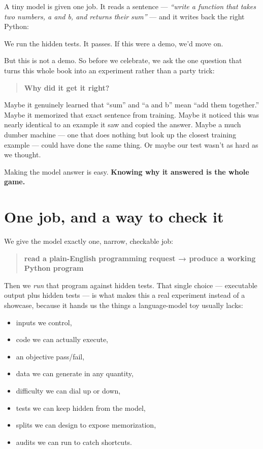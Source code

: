 A tiny model is given one job. It reads a sentence --- \emph{``write a
function that takes two numbers, a and b, and returns their sum''} ---
and it writes back the right Python:

\begin{Shaded}
\begin{Highlighting}[]
    \OperatorTok{+}
\end{Highlighting}
\end{Shaded}

We run the hidden tests. It passes. If this were a demo, we'd move on.

But this is not a demo. So before we celebrate, we ask the one question
that turns this whole book into an experiment rather than a party trick:

\begin{quote}
\textbf{Why did it get it right?}
\end{quote}

Maybe it genuinely learned that ``sum'' and ``a and b'' mean ``add them
together.'' Maybe it memorized that exact sentence from training. Maybe
it noticed this was nearly identical to an example it saw and copied the
answer. Maybe a much dumber machine --- one that does nothing but look
up the closest training example --- could have done the same thing. Or
maybe our test wasn't as hard as we thought.

Making the model answer is easy. \textbf{Knowing why it answered is the
whole game.}

\section{One job, and a way to check
it}\label{one-job-and-a-way-to-check-it}

We give the model exactly one, narrow, checkable job:

\begin{quote}
\textbf{read a plain-English programming request → produce a working
Python program}
\end{quote}

Then we \emph{run} that program against hidden tests. That single choice
--- executable output plus hidden tests --- is what makes this a real
experiment instead of a showcase, because it hands us the things a
language-model toy usually lacks:

\begin{itemize}
\tightlist
\item
  inputs we control,
\item
  code we can actually execute,
\item
  an objective pass/fail,
\item
  data we can generate in any quantity,
\item
  difficulty we can dial up or down,
\item
  tests we can keep hidden from the model,
\item
  splits we can design to expose memorization,
\item
  audits we can run to catch shortcuts.
\end{itemize}

